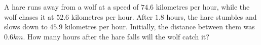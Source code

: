 A hare runs away from a wolf at a speed of $74.6$ kilometres per hour, while the wolf chases it at $52.6$ kilometres per hour. After $1.8$ hours, the hare stumbles and slows down to $45.9$ kilometres per hour. Initially, the distance between them was $0.6km$. How many hours after the hare falls will the wolf catch it?
